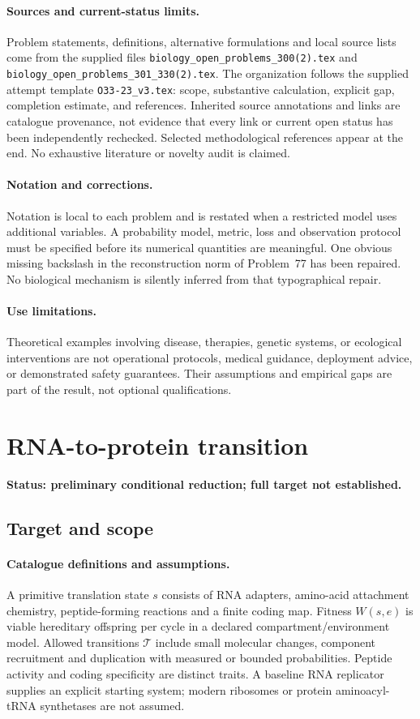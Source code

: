 \documentclass[11pt]{article}
\begin{document}
\paragraph{Sources and current-status limits.}
Problem statements, definitions, alternative formulations and local source lists
come from the supplied files
\texttt{biology\_open\_problems\_300(2).tex} and
\texttt{biology\_open\_problems\_301\_330(2).tex}.
The organization follows the supplied attempt template
\texttt{O33-23\_v3.tex}: scope, substantive calculation, explicit gap,
completion estimate, and references. Inherited source annotations and links are
catalogue provenance, not evidence that every link or current open status has
been independently rechecked. Selected methodological references appear at the
end. No exhaustive literature or novelty audit is claimed.

\paragraph{Notation and corrections.}
Notation is local to each problem and is restated when a restricted model uses
additional variables. A probability model, metric, loss and observation protocol
must be specified before its numerical quantities are meaningful. One obvious
missing backslash in the reconstruction norm of Problem~77 has been repaired.
No biological mechanism is silently inferred from that typographical repair.

\paragraph{Use limitations.}
Theoretical examples involving disease, therapies, genetic systems, or ecological
interventions are not operational protocols, medical guidance, deployment advice,
or demonstrated safety guarantees. Their assumptions and empirical gaps are part
of the result, not optional qualifications.


\section*{RNA-to-protein transition}
\label{prob:295}
\noindent\textbf{Status: preliminary conditional reduction; full target not established.}
\subsection{Target and scope}
\paragraph{Catalogue definitions and assumptions.}
A primitive translation state $s$ consists of RNA adapters, amino-acid attachment chemistry, peptide-forming reactions and a finite coding map. Fitness $W(s,e)$ is viable hereditary offspring per cycle in a declared compartment/environment model. Allowed transitions $\mathcal T$ include small molecular changes, component recruitment and duplication with measured or bounded probabilities. Peptide activity and coding specificity are distinct traits. A baseline RNA replicator supplies an explicit starting system; modern ribosomes or protein aminoacyl-tRNA synthetases are not assumed.
\end{document}

